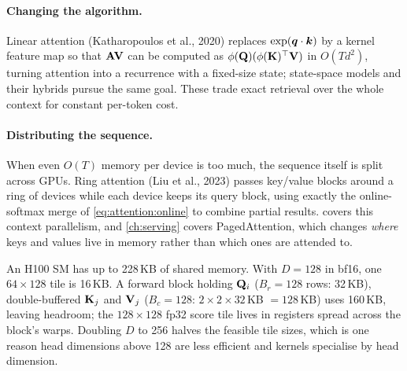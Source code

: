 \paragraph{Changing the algorithm.} Linear attention (Katharopoulos et al., 2020) replaces
$\exp(\bm{q}\cdot\bm{k})$ by a kernel feature map so that $\mathbf{A}\mathbf{V}$ can be computed as
$\phi(\mathbf{Q})(\phi(\mathbf{K})^\top\mathbf{V})$ in $O(Td^2)$, turning attention into a recurrence with a
fixed-size state; state-space models and their hybrids pursue the same goal. These trade exact
retrieval over the whole context for constant per-token cost.

\paragraph{Distributing the sequence.} When even $O(T)$ memory per device is too much, the sequence
itself is split across GPUs. Ring attention (Liu et al., 2023) passes key/value blocks around a ring
of devices while each device keeps its query block, using exactly the online-softmax merge of
\cref{eq:attention:online} to combine partial results.  covers this context
parallelism, and \cref{ch:serving} covers PagedAttention, which changes \emph{where} keys and values
live in memory rather than which ones are attended to.

\begin{napkinmath}
An H100 SM has up to 228\,KB of shared memory. With $D=128$ in bf16, one $64\times128$ tile is 16\,KB.
A forward block holding $\mathbf{Q}_i$ ($B_r=128$ rows: 32\,KB), double-buffered $\mathbf{K}_j$ and
$\mathbf{V}_j$ ($B_c=128$: $2\times2\times 32$\,KB $=128$\,KB) uses 160\,KB, leaving headroom; the
$128\times128$ fp32 score tile lives in registers spread across the block's warps. Doubling $D$ to
256 halves the feasible tile sizes, which is one reason head dimensions above 128 are less
efficient and kernels specialise by head dimension.
\end{napkinmath}

